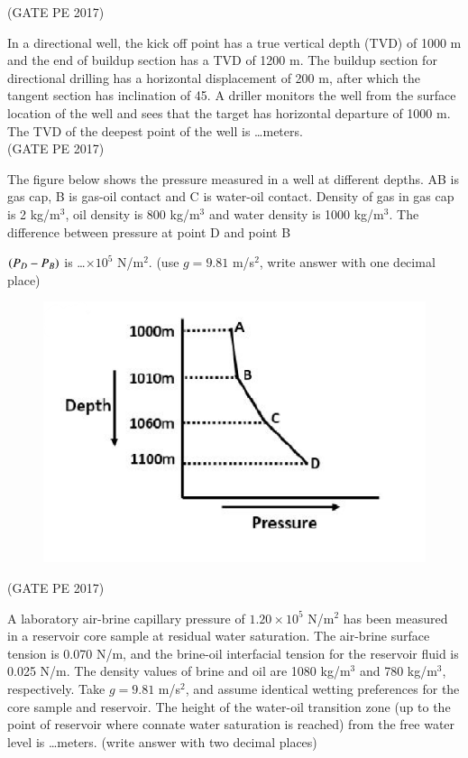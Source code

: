 \documentclass[journal,12pt,onecolumn]{IEEEtran}
\theoremstyle{remark}
\begin{document}
\begin{enumerate}
\hfill{(GATE PE 2017)}

\item In a directional well, the kick off point has a true vertical depth (TVD) of 1000 m and the end of buildup section has a TVD of 1200 m. The buildup section for directional drilling has a horizontal displacement of 200 m, after which the tangent section has inclination of 45\degree.
A driller monitors the well from the surface location of the well and sees that the target has horizontal departure of 1000 m. The TVD of the deepest point of the well is \dots meters.\\

\hfill{(GATE PE 2017)}

\item The figure below shows the pressure measured in a well at different depths. AB is gas cap, B is gas-oil contact and C is water-oil contact. Density of gas in gas cap is 2 kg/m$^3$, oil density is 800 kg/m$^3$ and water density is 1000 kg/m$^3$.
The difference between pressure at point D and point B {$\left(P_D - P_B\right)$ is \dots $\times 10^5$ N/m$^2$. (use $g = 9.81$ m/s$^2$, write answer with one decimal place)\\
\begin{figure}[h]
    \centering
    \includegraphics[width=0.5\columnwidth]{GraphQ _33.png}
    \caption{}
    \label{fig:placeholder}
\end{figure}
\hfill{(GATE PE 2017)}
\item A laboratory air-brine capillary pressure of $1.20 \times 10^5$ N/m$^2$ has been measured in a reservoir core sample at residual water saturation. The air-brine surface tension is 0.070 N/m, and the brine-oil interfacial tension for the reservoir fluid is 0.025 N/m. The density values of brine and oil are 1080 kg/m$^3$ and 780 kg/m$^3$, respectively.
Take $g = 9.81$ m/s$^2$, and assume identical wetting preferences for the core sample and reservoir. The height of the water-oil transition zone (up to the point of reservoir where connate water saturation is reached) from the free water level is \dots meters. (write answer with two decimal places)\\

}
\end{enumerate}
\end{document}
